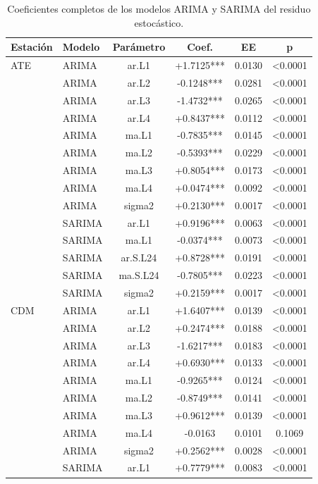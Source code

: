 \begin{table}[H]
\centering
\caption{Coeficientes completos de los modelos ARIMA y SARIMA del residuo estocástico.}
\label{tab_arima_full}
\begin{tabular}{llcccc}
\toprule
\textbf{Estación} & \textbf{Modelo} & \textbf{Parámetro} & \textbf{Coef.} & \textbf{EE} & \textbf{p} \\
\midrule
ATE & ARIMA & ar.L1 & +1.7125*** & 0.0130 & <0.0001 \\
 & ARIMA & ar.L2 & -0.1248*** & 0.0281 & <0.0001 \\
 & ARIMA & ar.L3 & -1.4732*** & 0.0265 & <0.0001 \\
 & ARIMA & ar.L4 & +0.8437*** & 0.0112 & <0.0001 \\
 & ARIMA & ma.L1 & -0.7835*** & 0.0145 & <0.0001 \\
 & ARIMA & ma.L2 & -0.5393*** & 0.0229 & <0.0001 \\
 & ARIMA & ma.L3 & +0.8054*** & 0.0173 & <0.0001 \\
 & ARIMA & ma.L4 & +0.0474*** & 0.0092 & <0.0001 \\
 & ARIMA & sigma2 & +0.2130*** & 0.0017 & <0.0001 \\
 & SARIMA & ar.L1 & +0.9196*** & 0.0063 & <0.0001 \\
 & SARIMA & ma.L1 & -0.0374*** & 0.0073 & <0.0001 \\
 & SARIMA & ar.S.L24 & +0.8728*** & 0.0191 & <0.0001 \\
 & SARIMA & ma.S.L24 & -0.7805*** & 0.0223 & <0.0001 \\
 & SARIMA & sigma2 & +0.2159*** & 0.0017 & <0.0001 \\
\midrule
CDM & ARIMA & ar.L1 & +1.6407*** & 0.0139 & <0.0001 \\
 & ARIMA & ar.L2 & +0.2474*** & 0.0188 & <0.0001 \\
 & ARIMA & ar.L3 & -1.6217*** & 0.0183 & <0.0001 \\
 & ARIMA & ar.L4 & +0.6930*** & 0.0133 & <0.0001 \\
 & ARIMA & ma.L1 & -0.9265*** & 0.0124 & <0.0001 \\
 & ARIMA & ma.L2 & -0.8749*** & 0.0141 & <0.0001 \\
 & ARIMA & ma.L3 & +0.9612*** & 0.0139 & <0.0001 \\
 & ARIMA & ma.L4 & -0.0163 & 0.0101 & 0.1069 \\
 & ARIMA & sigma2 & +0.2562*** & 0.0028 & <0.0001 \\
 & SARIMA & ar.L1 & +0.7779*** & 0.0083 & <0.0001 \\

\end{tabular}
\end{table}
